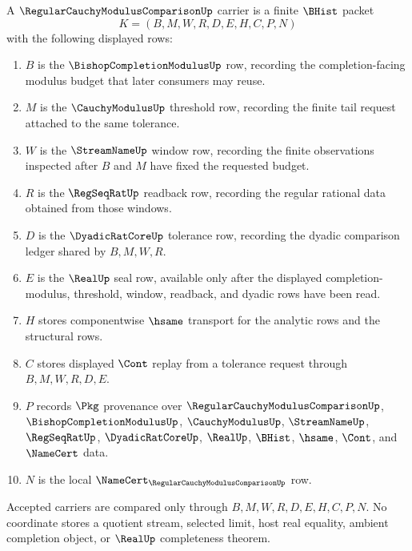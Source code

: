 \begin{definition}
\label{def:regular-cauchy-modulus-comparison-carrier}
A $\RegularCauchyModulusComparisonUp$ carrier is a finite $\BHist$ packet
$$
K=(B,M,W,R,D,E,H,C,P,N)
$$
with the following displayed rows:
\begin{enumerate}
\item $B$ is the $\BishopCompletionModulusUp$ row, recording the completion-facing modulus budget that later consumers may reuse.
\item $M$ is the $\CauchyModulusUp$ threshold row, recording the finite tail request attached to the same tolerance.
\item $W$ is the $\StreamNameUp$ window row, recording the finite observations inspected after $B$ and $M$ have fixed the requested budget.
\item $R$ is the $\RegSeqRatUp$ readback row, recording the regular rational data obtained from those windows.
\item $D$ is the $\DyadicRatCoreUp$ tolerance row, recording the dyadic comparison ledger shared by $B,M,W,R$.
\item $E$ is the $\RealUp$ seal row, available only after the displayed completion-modulus, threshold, window, readback, and dyadic rows have been read.
\item $H$ stores componentwise $\hsame$ transport for the analytic rows and the structural rows.
\item $C$ stores displayed $\Cont$ replay from a tolerance request through $B,M,W,R,D,E$.
\item $P$ records $\Pkg$ provenance over $\RegularCauchyModulusComparisonUp$, $\BishopCompletionModulusUp$, $\CauchyModulusUp$, $\StreamNameUp$, $\RegSeqRatUp$, $\DyadicRatCoreUp$, $\RealUp$, $\BHist$, $\hsame$, $\Cont$, and $\NameCert$ data.
\item $N$ is the local $\NameCert_{\RegularCauchyModulusComparisonUp}$ row.
\end{enumerate}
Accepted carriers are compared only through $B,M,W,R,D,E,H,C,P,N$. No coordinate stores a quotient stream, selected limit, host real equality, ambient completion object, or $\RealUp$ completeness theorem.
\end{definition}

